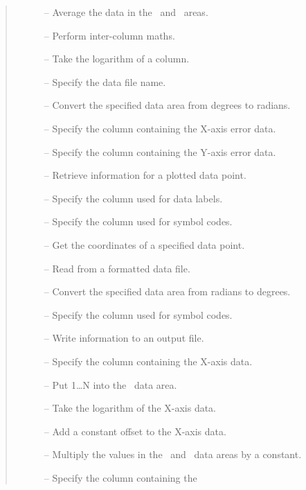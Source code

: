 \small
\begin {quote}
  \begin {description}
  \item [] -- Average the data in the \xcol\ and \ycol\ areas.
  \item [] -- Perform inter-column maths.
  \item [] -- Take the logarithm of a column.
  \item [] -- Specify the data file name.
  \item [] -- Convert the specified data area from degrees to
    radians.
  \item [] -- Specify the column containing
    the X-axis error data.
  \item [] -- Specify the column containing
    the Y-axis error data.
  \item [] -- Retrieve information for a
    plotted data point.
  \item [] -- Specify the column used for
    data labels.
  \item [] -- Specify the column used for
    symbol codes.
  \item [] -- Get the coordinates of a specified data point.
  \item [] -- Read from a formatted data file.
  \item [] -- Convert the specified data area from radians to
    degrees.
  \item [] -- Specify the column used for
    symbol codes.
  \item [] -- Write information to an output file.
  \item [] -- Specify the column containing the
    X-axis data.
  \item [] -- Put 1\ldots N into the \xcol\ data
    area.
  \item [] -- Take the logarithm of the
    X-axis data.
  \item [] -- Add a constant offset to the
    X-axis data.
  \item [] -- Multiply the values in the \xcol\ and \excol\ data areas
    by a constant.
  \item [] -- Specify the column containing the

\end{description}
\end{quote}
